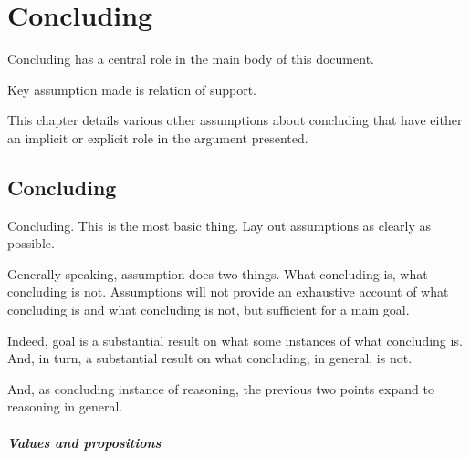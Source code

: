 \chapter{Concluding}
\label{chapter:concluding}

\begin{note}
  Concluding has a central role in the main body of this document.

  Key assumption made is relation of support.

  This chapter details various other assumptions about concluding that have either an implicit or explicit role in the argument presented.
\end{note}

\section{Concluding}
\label{sec:outline:concluding}

\begin{note}[Overview]
  Concluding.
  This is the most basic thing.
  Lay out assumptions as clearly as possible.

  Generally speaking, assumption does two things.
  What concluding is, what concluding is not.
  Assumptions will not provide an exhaustive account of what concluding is and what concluding is not, but sufficient for a main goal.

  Indeed, goal is a substantial result on what some instances of what concluding is.
  And, in turn, a substantial result on what concluding, in general, is not.

  And, as concluding instance of reasoning, the previous two points expand to reasoning in general.
\end{note}


\paragraph*{Values and propositions}

